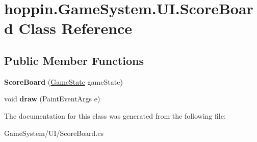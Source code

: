 \hypertarget{classhoppin_1_1_game_system_1_1_u_i_1_1_score_board}{}\section{hoppin.\+Game\+System.\+U\+I.\+Score\+Board Class Reference}
\label{classhoppin_1_1_game_system_1_1_u_i_1_1_score_board}
\subsection*{Public Member Functions}
\begin{DoxyCompactItemize}
\item 
{\bfseries Score\+Board} (\hyperlink{classhoppin_1_1_game_system_1_1_game_state}{Game\+State} game\+State)\hypertarget{classhoppin_1_1_game_system_1_1_u_i_1_1_score_board_a8cef263c361863428307f1d378cc5811}{}\label{classhoppin_1_1_game_system_1_1_u_i_1_1_score_board_a8cef263c361863428307f1d378cc5811}

\item 
void {\bfseries draw} (Paint\+Event\+Args e)\hypertarget{classhoppin_1_1_game_system_1_1_u_i_1_1_score_board_a76cab46ef5d0c5b8348b309510d099fa}{}\label{classhoppin_1_1_game_system_1_1_u_i_1_1_score_board_a76cab46ef5d0c5b8348b309510d099fa}

\end{DoxyCompactItemize}


The documentation for this class was generated from the following file\+:\begin{DoxyCompactItemize}
\item 
Game\+System/\+U\+I/Score\+Board.\+cs\end{DoxyCompactItemize}
